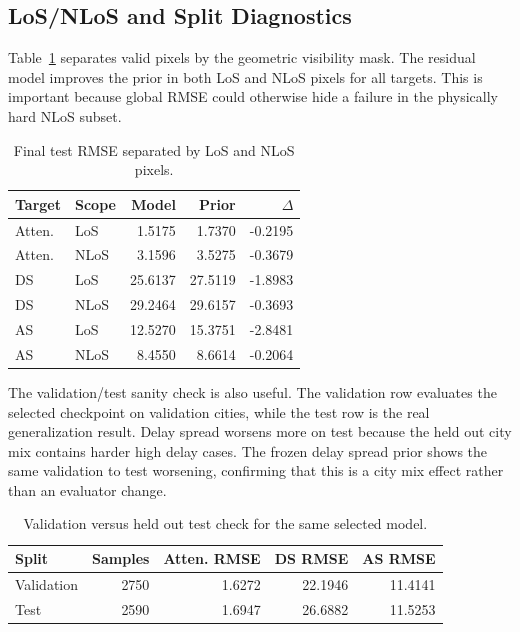 \documentclass[journal]{IEEEtran}
\begin{document}
\subsection{LoS/NLoS and Split Diagnostics}

Table~\ref{tab:los-nlos} separates valid pixels by the geometric visibility
mask. The residual model improves the prior in both LoS and NLoS pixels for all
targets. This is important because global RMSE could otherwise hide a failure
in the physically hard NLoS subset.

\begin{table}[t]
\centering
\caption{Final test RMSE separated by LoS and NLoS pixels.}
\label{tab:los-nlos}
\scriptsize
\begin{tabular}{llrrr}
\toprule
Target & Scope & Model & Prior & \(\Delta\) \\
\midrule
Atten. & LoS & 1.5175 & 1.7370 & -0.2195 \\
Atten. & NLoS & 3.1596 & 3.5275 & -0.3679 \\
DS & LoS & 25.6137 & 27.5119 & -1.8983 \\
DS & NLoS & 29.2464 & 29.6157 & -0.3693 \\
AS & LoS & 12.5270 & 15.3751 & -2.8481 \\
AS & NLoS & 8.4550 & 8.6614 & -0.2064 \\
\bottomrule
\end{tabular}
\end{table}

The validation/test sanity check is also useful. The validation row evaluates
the selected checkpoint on validation cities, while the test row is the real
generalization result. Delay spread worsens more on test because the
held out city mix contains harder high delay cases. The frozen delay spread
prior shows the same validation to test worsening, confirming that this is a
city mix effect rather than an evaluator change.

\begin{table}[t]
\centering
\caption{Validation versus held out test check for the same selected model.}
\label{tab:val-test}
\scriptsize
\begin{tabular}{lrrrr}
\toprule
Split & Samples & Atten. RMSE & DS RMSE & AS RMSE \\
\midrule
Validation & 2750 & 1.6272 & 22.1946 & 11.4141 \\
Test & 2590 & 1.6947 & 26.6882 & 11.5253 \\
\bottomrule
\end{tabular}
\end{table}
\end{document}
